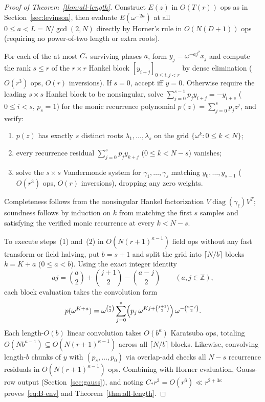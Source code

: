 \documentclass[11pt,reqno]{amsart}
\numberwithin{equation}{section}
\theoremstyle{definition}
\theoremstyle{remark}
\newcommand{\Z}{\mathbb{Z}}
\newcommand{\diag}{\operatorname{diag}}
\begin{document}
\begin{proof}[Proof of Theorem~\ref{thm:all-length}]
Construct $E(z)$ in $O(T(r))$ ops as in Section~\ref{sec:levinson}, then evaluate $E(\omega^{-2a})$ at all $0\le a<L=N/\gcd(2,N)$ directly by Horner's rule in $O(N(D+1))$ ops (requiring no power-of-two length or extra roots).

For each of the at most $C_*$ surviving phases $a$, form $y_j = \omega^{-aj^2}x_j$ and compute the rank $s\le r$ of the $r\times r$ Hankel block $[y_{i+j}]_{0\le i,j<r}$ by dense elimination ($O(r^3)$ ops, $O(r)$ inversions). If $s=0$, accept iff $y=0$. Otherwise require the leading $s\times s$ Hankel block to be nonsingular, solve $\sum_{j=0}^{s-1} p_j y_{i+j} = -y_{i+s}$ ($0\le i<s$, $p_s=1$) for the monic recurrence polynomial $p(z) = \sum_{j=0}^s p_j z^j$, and verify:
\begin{enumerate}[label=(\arabic*),leftmargin=2em]
\item $p(z)$ has exactly $s$ distinct roots $\lambda_1,\ldots,\lambda_s$ on the grid $\{\omega^k : 0\le k<N\}$;
\item every recurrence residual $\sum_{j=0}^s p_j y_{k+j}$ ($0\le k<N-s$) vanishes;
\item solve the $s\times s$ Vandermonde system for $\gamma_1,\ldots,\gamma_s$ matching $y_0,\ldots,y_{s-1}$ ($O(r^3)$ ops, $O(r)$ inversions), dropping any zero weights.
\end{enumerate}
Completeness follows from the nonsingular Hankel factorization $V\diag(\gamma_\ell)V^T$; soundness follows by induction on $k$ from matching the first $s$ samples and satisfying the verified monic recurrence at every $k<N-s$.

To execute steps~(1) and~(2) in $O(N(r+1)^{\kappa-1})$ field ops without any fast transform or field halving, put $b = s+1$ and split the grid into $\lceil N/b\rceil$ blocks $k = K + a$ ($0\le a<b$). Using the exact integer identity
\begin{equation}
\label{eq:blocked-chirp}
aj = \binom{a}{2} + \binom{j+1}{2} - \binom{a-j}{2}\qquad (a,j\in\Z),
\end{equation}
each block evaluation takes the convolution form
\[
p(\omega^{K+a}) = \omega^{\binom{a}{2}} \sum_{j=0}^s \Bigl(p_j\,\omega^{Kj + \binom{j+1}{2}}\Bigr)\,\omega^{-\binom{a-j}{2}}.
\]
Each length-$O(b)$ linear convolution takes $O(b^\kappa)$ Karatsuba ops, totaling $O(N b^{\kappa-1})\subseteq O(N(r+1)^{\kappa-1})$ across all $\lceil N/b\rceil$ blocks. Likewise, convolving length-$b$ chunks of $y$ with $(p_s,\ldots,p_0)$ via overlap-add checks all $N-s$ recurrence residuals in $O(N(r+1)^{\kappa-1})$ ops. Combining with Horner evaluation, Gauss-row output (Section~\ref{sec:gauss}), and noting $C_* r^3 = O(r^6) \ll r^{2+3\kappa}$ proves~\eqref{eq:B-env} and Theorem~\ref{thm:all-length}.
\end{proof}
\end{document}

